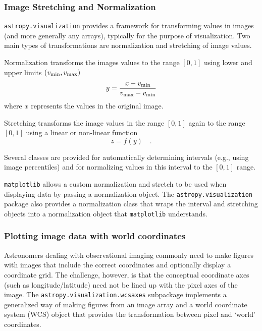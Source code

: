 \documentclass[modern]{aastex61}
\newcommand{\package}[1]{\texttt{#1}\xspace}
\begin{document}
\subsubsection{Image Stretching and Normalization}

\label{sec:stretch}

\package{astropy.visualization} provides a framework for transforming values in images (and more generally any arrays), typically for the purpose of visualization. Two main types of transformations are normalization and stretching of image values.

Normalization transforms the images values to the range $[0,1]$ using lower and upper limits $(v_{\rm min}, v_{\rm max})$
\begin{equation}
y = \frac{x - v_{\rm min}}{v_{\rm max} - v_{\rm min}}
\end{equation}
where $x$ represents the values in the original image.

Stretching transforms the image values in the range $[0,1]$ again to the range $[0,1]$ using a linear or non-linear function
\begin{equation}
z = f(y) \quad .
\end{equation}

Several classes are provided for automatically determining intervals (e.g., using image percentiles) and for normalizing values in this interval to the $[0,1]$ range.

\package{matplotlib} allows a custom normalization and stretch to be used when displaying data by passing a normalization object. The \package{astropy.visualization} package also provides a normalization class that wraps the interval and stretching objects into a normalization object that \package{matplotlib} understands.

\subsubsection{Plotting image data with world coordinates}

Astronomers dealing with observational imaging commonly need to make figures with images that include the correct coordinates and optionally display a coordinate grid. The challenge, however, is that the conceptual coordinate axes (such as longitude/latitude) need not be lined up with the pixel axes of the image. The \package{astropy.visualization.wcsaxes} subpackage implements a generalized way of making figures from an image array and a world coordinate system (WCS) object that provides the transformation between pixel and `world' coordinates.
\end{document}
